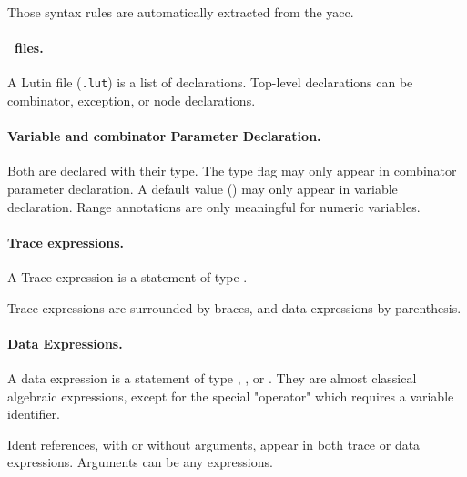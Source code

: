  Those syntax rules are automatically extracted from the yacc.



\paragraph{\lutin\ files.}

A  Lutin file  ({\tt .lut})  is  a list  of declarations.   Top-level
declarations can be combinator, exception, or node declarations.\\

\decls


\paragraph{Variable and combinator Parameter Declaration.}
Both are declared  with their type. The   type flag may
only  appear in  combinator parameter  declaration.  A  default value
(\bnftoken{=})   may   only   appear  in   variable
declaration.   Range  annotations  are  only meaningful  for  numeric
variables.

\varparams

\types

\paragraph{Trace expressions.}

 A Trace expression is a statement of type .


\statements

Trace expressions  are surrounded by braces, and  data expressions by
parenthesis.

\paragraph{Data Expressions.}
 A  data   expression  is   a  statement  of   type  ,
 ,  or  .   They  are  almost  classical
 algebraic   expressions,   except   for   the   special   "operator"
  which requires a variable identifier.


\expressions


Ident references, with or without  arguments, appear in both trace or
data expressions.  Arguments can be any expressions.


